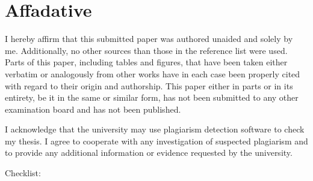 \documentclass[
  man,
  floatsintext,
  longtable,
  nolmodern,
  notxfonts,
  notimes,
  colorlinks=true,linkcolor=blue,citecolor=blue,urlcolor=blue]{apa7}
\begin{document}
\newpage

\section{Affadative}\label{affadative}

I hereby affirm that this submitted paper was authored unaided and
solely by me. Additionally, no other sources than those in the reference
list were used. Parts of this paper, including tables and figures, that
have been taken either verbatim or analogously from other works have in
each case been properly cited with regard to their origin and
authorship. This paper either in parts or in its entirety, be it in the
same or similar form, has not been submitted to any other examination
board and has not been published.

I acknowledge that the university may use plagiarism detection software
to check my thesis. I agree to cooperate with any investigation of
suspected plagiarism and to provide any additional information or
evidence requested by the university.

Checklist:
\end{document}
